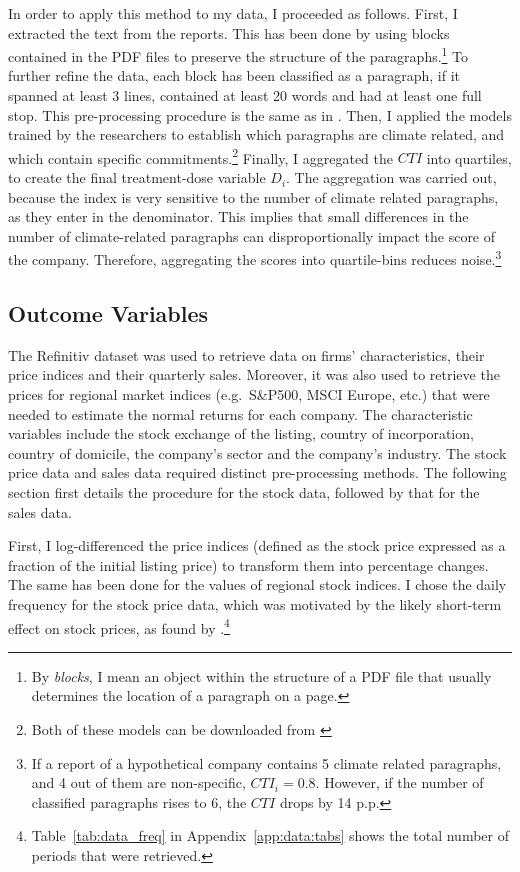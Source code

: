 \documentclass[12pt]{article}
\begin{document}
In order to apply this method to my data, I proceeded as follows. First, I extracted the text from the reports. This has been done by using blocks contained in the PDF files to preserve the structure of the paragraphs.\footnote{By \textit{blocks}, I mean an object within the structure of a PDF file that usually determines the location of a paragraph on a page.} To further refine the data, each block has been classified as a paragraph, if it spanned at least 3 lines, contained at least 20 words and had at least one full stop. This pre-processing procedure is the same as in \textcite{binglerHowCheapTalk2024}. Then, I applied the models trained by the researchers to establish which paragraphs are climate related, and which contain specific commitments.\footnote{Both of these models can be downloaded from \href{https://huggingface.co/climatebert}{}} Finally, I aggregated the $CTI$ into quartiles, to create the final treatment-dose variable $D_i$. The aggregation was carried out, because the index is very sensitive to the number of climate related paragraphs, as they enter in the denominator. This implies that small differences in the number of climate-related  paragraphs can disproportionally impact the score of the company. Therefore, aggregating the scores into quartile-bins reduces noise.\footnote{If a report of a hypothetical company contains 5 climate related paragraphs, and 4 out of them are non-specific, $CTI_i=0.8$. However, if the number of classified paragraphs rises to 6, the $CTI$ drops by 14 p.p.}



\subsection{Outcome Variables}

The Refinitiv dataset was used to retrieve data on firms' characteristics, their price indices and their quarterly sales. Moreover, it was also used to retrieve the prices for regional market indices (e.g.\ S\&P500, MSCI Europe, etc.) that were needed to estimate the normal returns for each company. The characteristic variables include the stock exchange of the listing, country of incorporation, country of domicile, the company's sector and the company's industry. The stock price data and sales data required distinct pre-processing methods. The following section first details the procedure for the stock data, followed by that for the sales data.

First, I log-differenced the price indices (defined as the stock price expressed as a fraction of the initial listing price) to transform them into percentage changes. The same has been done for the values of regional stock indices. I chose the daily frequency for the stock price data, which was motivated by the likely short-term effect on stock prices, as found by \textcite{schusterStockPriceReactions2023}.\footnote{Table~\ref{tab:data_freq} in Appendix~\ref{app:data:tabs} shows the total number of periods that were retrieved.}
\end{document}
